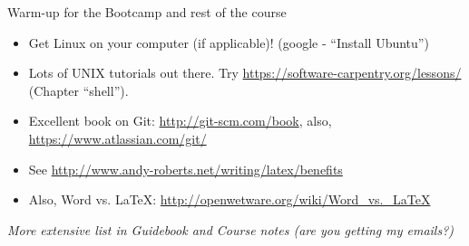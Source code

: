 \documentclass[xcolor={usenames,x11names},compress]{beamer}
\renewcommand{\(}{\begin{columns}}
\renewcommand{\)}{\end{columns}}
\newcommand{\<}[1]{\begin{column}{#1}}
\renewcommand{\>}{\end{column}}
\begin{document}






\begin{frame}{Warm-up for the Bootcamp and rest of the course}

\begin{itemize}\itemsep8pt

\item Get Linux on your computer (if applicable)! (google - ``Install Ubuntu'')
\item Lots of UNIX tutorials out there. Try 
\url{https://software-carpentry.org/lessons/} (Chapter ``shell''). 
\item Excellent book on Git: \url{http://git-scm.com/book}, also,
\url{https://www.atlassian.com/git/}
\item See \url{http://www.andy-roberts.net/writing/latex/benefits}
\item Also, Word vs. \LaTeX: \url{http://openwetware.org/wiki/Word_vs._LaTeX}

\end{itemize}

\centering
{\it More extensive list in Guidebook and Course notes (are you getting my emails?)}

\end{frame}
\end{document}
